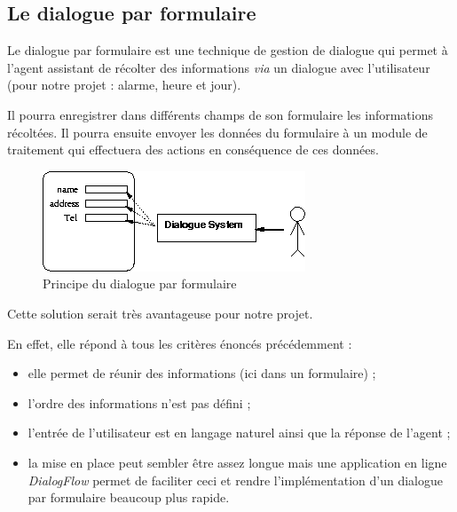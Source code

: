 \FloatBarrier

\subsection{Le dialogue par formulaire}
Le dialogue par formulaire est une technique de gestion de dialogue qui permet à l'agent assistant de récolter des informations \emph{via} un dialogue avec l'utilisateur (pour notre projet : alarme, heure et jour). 

Il pourra enregistrer dans différents champs de son formulaire les informations récoltées. Il pourra ensuite envoyer les données du formulaire à un module de traitement qui effectuera des actions en conséquence de ces données.

\begin{figure}[H]
\centering
    \includegraphics[scale=0.7]{images/slot.png} %
    \caption{Principe du dialogue par formulaire}
\end{figure}

Cette solution serait très avantageuse pour notre projet. 

En effet, elle répond à tous les critères énoncés précédemment : 
\begin{itemize}
    \item elle permet de réunir des informations (ici dans un formulaire) ;
    \item l'ordre des informations n'est pas défini ;
    \item l'entrée de l'utilisateur est en langage naturel ainsi que la réponse de l'agent ;
    \item la mise en place peut sembler être assez longue mais une application en ligne \textit{DialogFlow} permet de faciliter ceci et rendre l'implémentation d'un dialogue par formulaire beaucoup plus rapide.
\end{itemize}



